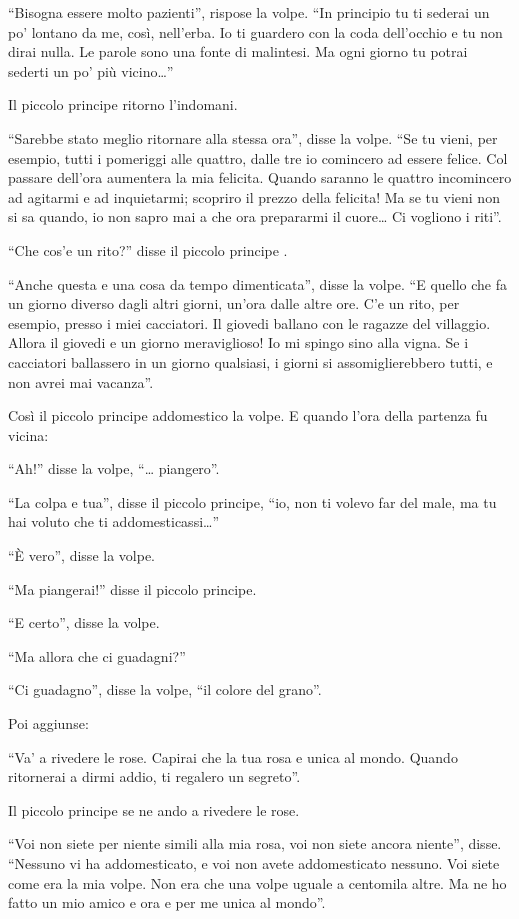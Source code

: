 \documentclass[11pt]{scrbook}
\begin{document}
``Bisogna essere molto pazienti'', rispose la volpe. ``In principio tu
ti sederai un po' lontano da me, così, nell'erba. Io ti guardero con la
coda dell'occhio e tu non dirai nulla. Le parole sono una fonte di
malintesi. Ma ogni giorno tu potrai sederti un po' più vicino\ldots{}''

Il piccolo principe ritorno l'indomani.

``Sarebbe stato meglio ritornare alla stessa ora'', disse la volpe. ``Se
tu vieni, per esempio, tutti i pomeriggi alle quattro, dalle tre io
comincero ad essere felice. Col passare dell'ora aumentera la mia
felicita. Quando saranno le quattro incomincero ad agitarmi e ad
inquietarmi; scopriro il prezzo della felicita! Ma se tu vieni non si sa
quando, io non sapro mai a che ora prepararmi il cuore\ldots{} Ci
vogliono i riti''.

``Che cos'e un rito?'' disse il piccolo principe .

``Anche questa e una cosa da tempo dimenticata'', disse la volpe. ``E
quello che fa un giorno diverso dagli altri giorni, un'ora dalle altre
ore. C'e un rito, per esempio, presso i miei cacciatori. Il giovedi
ballano con le ragazze del villaggio. Allora il giovedi e un giorno
meraviglioso! Io mi spingo sino alla vigna. Se i cacciatori ballassero
in un giorno qualsiasi, i giorni si assomiglierebbero tutti, e non avrei
mai vacanza''.

Così il piccolo principe addomestico la volpe. E quando l'ora della
partenza fu vicina:

``Ah!'' disse la volpe, ``\ldots{} piangero''.

``La colpa e tua'', disse il piccolo principe, ``io, non ti volevo far
del male, ma tu hai voluto che ti addomesticassi\ldots{}''

``È vero'', disse la volpe.

``Ma piangerai!'' disse il piccolo principe.

``E certo'', disse la volpe.

``Ma allora che ci guadagni?''

``Ci guadagno'', disse la volpe, ``il colore del grano''.

Poi aggiunse:

``Va' a rivedere le rose. Capirai che la tua rosa e unica al mondo.
Quando ritornerai a dirmi addio, ti regalero un segreto''.

Il piccolo principe se ne ando a rivedere le rose.

``Voi non siete per niente simili alla mia rosa, voi non siete ancora
niente'', disse. ``Nessuno vi ha addomesticato, e voi non avete
addomesticato nessuno. Voi siete come era la mia volpe. Non era che una
volpe uguale a centomila altre. Ma ne ho fatto un mio amico e ora e per
me unica al mondo''.
\end{document}
